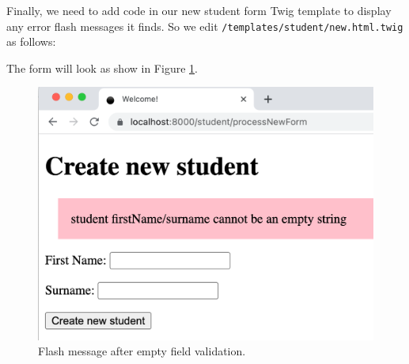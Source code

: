 \documentclass[a4paperpaper,openright]{book}
\newenvironment{Shaded}{}{}
\newcommand{\KeywordTok}[1]{\textcolor[rgb]{0.00,0.44,0.13}{\textbf{#1}}}
\newcommand{\NormalTok}[1]{#1}
\newcommand{\OtherTok}[1]{\textcolor[rgb]{0.00,0.44,0.13}{#1}}
\newcommand{\StringTok}[1]{\textcolor[rgb]{0.25,0.44,0.63}{#1}}
\begin{document}
Finally, we need to add code in our new student form Twig template to
display any error flash messages it finds. So we edit
\texttt{/templates/student/new.html.twig} as follows:

\begin{Shaded}
\end{Shaded}

The form will look as show in Figure \ref{new_student_form_flash}.

\begin{figure}
\centering
\includegraphics{./tex2pdf.-8a1528da847c818a/88d0c302e1f2d9632d3424d8f78659914cf4b231.png}
\caption{Flash message after empty field validation.
\label{new_student_form_flash}}
\end{figure}
\end{document}

